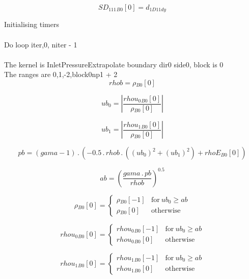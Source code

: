 \documentclass{article}
\begin{document}
\begin{dmath}{SD_{111}{_{B0}}}[{0}] = d_{1 D11 dy}\end{dmath}

\noindent Initialising timers\\
\\\noindent Do loop iter,0, niter - 1\\
\\\noindent The kernel is InletPressureExtrapolate boundary dir0 side0, block is 0\\\noindent The ranges are 0,1,-2,block0np1 + 2\\\begin{dmath}rhob = {\rho{_{B0}}}[{0}]\end{dmath}

\begin{dmath}ub_{0} = \left|{\frac{{rhou_{0}{_{B0}}}[{0}]}{{\rho{_{B0}}}[{0}]}}\right|\end{dmath}

\begin{dmath}ub_{1} = \left|{\frac{{rhou_{1}{_{B0}}}[{0}]}{{\rho{_{B0}}}[{0}]}}\right|\end{dmath}

\begin{dmath}pb = \left(gama - 1\right) \,.\, \left(- 0.5 \,.\, rhob \,.\, \left(\left(ub_{0} \right)^{2} + \left(ub_{1} \right)^{2}\right) + {rhoE{_{B0}}}[{0}]\right)\end{dmath}

\begin{dmath}ab = \left(\frac{gama \,.\, pb}{rhob} \right)^{0.5}\end{dmath}

\begin{dmath}{\rho{_{B0}}}[{0}] = \begin{cases} {\rho{_{B0}}}[{-1}] & \text{for}\: ub_{0} \geq ab \\{\rho{_{B0}}}[{0}] & \text{otherwise} \end{cases}\end{dmath}

\begin{dmath}{rhou_{0}{_{B0}}}[{0}] = \begin{cases} {rhou_{0}{_{B0}}}[{-1}] & \text{for}\: ub_{0} \geq ab \\{rhou_{0}{_{B0}}}[{0}] & \text{otherwise} \end{cases}\end{dmath}

\begin{dmath}{rhou_{1}{_{B0}}}[{0}] = \begin{cases} {rhou_{1}{_{B0}}}[{-1}] & \text{for}\: ub_{0} \geq ab \\{rhou_{1}{_{B0}}}[{0}] & \text{otherwise} \end{cases}\end{dmath}
\end{document}
